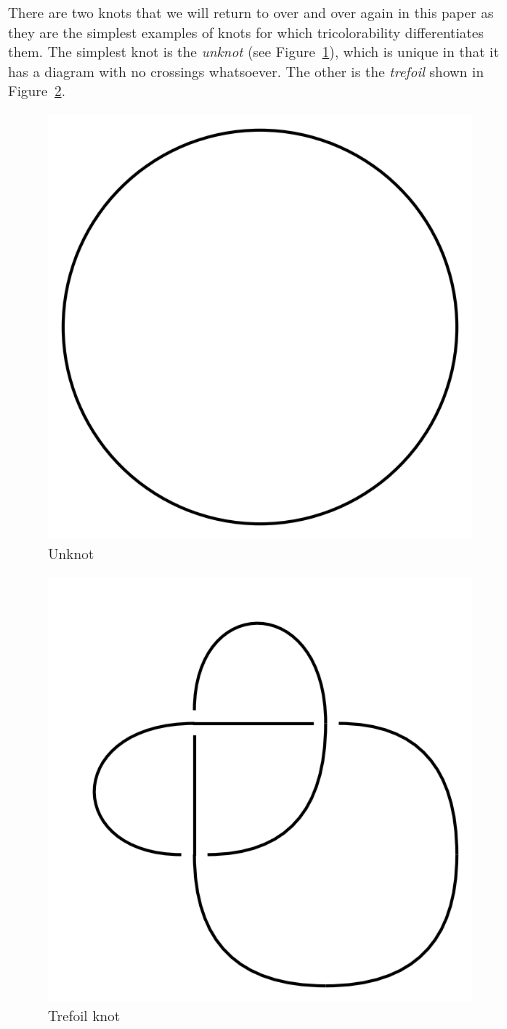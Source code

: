 \documentclass[12pt]{amsart}
\theoremstyle{definition}
\theoremstyle{remark}
\numberwithin{equation}{section}
\newcommand{\ds}{.3}
\begin{document}
There are two knots that we will return to over and over again in this paper
as they are the simplest examples of knots for which tricolorability
differentiates them. The simplest knot is the \textit{unknot} (see Figure~\ref{fig:unknot}), which
is unique in that it has a diagram with no crossings whatsoever. The
other is the \textit{trefoil} shown in Figure~\ref{fig:trefoil}.

\begin{figure}
  \includegraphics[scale=\ds]{unknot}
  \caption{Unknot}
  \label{fig:unknot}
\end{figure}

\begin{figure}
  \includegraphics[scale=\ds]{trefoil}
  \caption{Trefoil knot}
  \label{fig:trefoil}
\end{figure}
\end{document}

